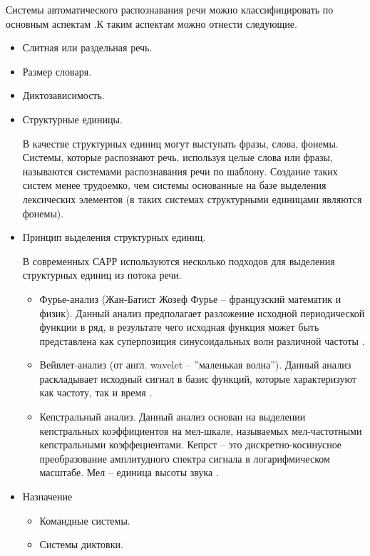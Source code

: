 Системы автоматического распознавания речи можно классифицировать по основным аспектам \cite{classif}.К таким аспектам можно отнести следующие. 
\begin{itemize}
	\item Слитная или раздельная речь.
	\item Размер словаря.
	\item Диктозависимость.
	\item Структурные единицы. 
	
	В качестве структурных единиц могут выступать фразы, слова, фонемы. Системы, которые распознают речь, используя целые слова или фразы, называются системами распознавания речи по шаблону. Создание таких систем менее трудоемко, чем системы основанные на базе выделения лексических элементов (в таких системах структурными единицами являются фонемы). 
	
	\item Принцип выделения структурных единиц.
	
	В современных САРР используются несколько подходов для выделения структурных единиц из потока речи. 
	\begin{itemize}
		\item Фурье-анализ (Жан-Батист Жозеф Фурье -- французский математик и физик). Данный анализ предполагает разложение исходной периодической функции в ряд, в результате чего исходная функция может быть представлена как суперпозиция синусоидальных волн различной частоты \cite{fur_veivlet}.
		\item Вейвлет-анализ (от англ. wavelet -- ''маленькая волна''). Данный анализ раскладывает исходный сигнал в базис функций, которые характеризуют как частоту, так и время \cite{fur_veivlet}.
		\item Кепстральный анализ. Данный анализ основан на выделении кепстральных коэффициентов на мел-шкале, называемых мел-частотными кепстральными коэффециентами. Кепрст -- это дискретно-косинусное преобразование амплитудного спектра сигнала в логарифмическом масштабе. Мел -- единица высоты звука \cite{kepstr}.
	\end{itemize}
	\item Назначение
	\begin{itemize}
		\item Командные системы.
		\item Системы диктовки.
	\end{itemize}
\end{itemize}


